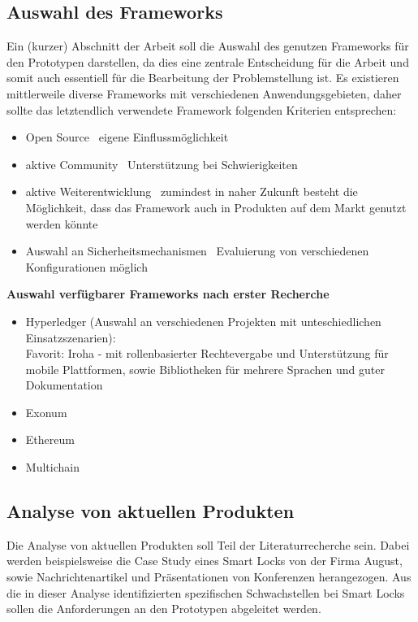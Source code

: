     \subsection*{Auswahl des Frameworks}
        Ein (kurzer) Abschnitt der Arbeit soll die Auswahl des genutzen Frameworks für den Prototypen darstellen, da dies eine zentrale Entscheidung für die Arbeit und somit auch essentiell für die Bearbeitung der Problemstellung ist.
        Es existieren mittlerweile diverse Frameworks mit verschiedenen Anwendungsgebieten, daher sollte das letztendlich verwendete Framework folgenden Kriterien entsprechen:
        \begin{itemize}
            \item Open Source \textrightarrow\ eigene Einflussmöglichkeit
            \item aktive Community \textrightarrow\ Unterstützung bei Schwierigkeiten
            \item aktive Weiterentwicklung \textrightarrow\ zumindest in naher Zukunft besteht die Möglichkeit, dass das Framework auch in Produkten auf dem Markt genutzt werden könnte
            \item Auswahl an Sicherheitsmechanismen \textrightarrow\ Evaluierung von verschiedenen Konfigurationen möglich
        \end{itemize}
        \medskip
        \textbf{Auswahl verfügbarer Frameworks nach erster Recherche}
        \begin{itemize}
            \item Hyperledger (Auswahl an verschiedenen Projekten mit unteschiedlichen Einsatzszenarien):\\
                Favorit: Iroha - mit rollenbasierter Rechtevergabe und Unterstützung für mobile Plattformen, sowie Bibliotheken für mehrere Sprachen und guter Dokumentation
            \item Exonum
            \item Ethereum
            \item Multichain
        \end{itemize}

    \subsection*{Analyse von aktuellen Produkten}
        Die Analyse von aktuellen Produkten soll Teil der Literaturrecherche sein. 
        Dabei werden beispielsweise die Case Study eines Smart Locks von der Firma August\cite{Ye2017}, sowie Nachrichtenartikel\cite{Tsing2017} und Präsentationen von Konferenzen\cite{Rose2014} herangezogen.
        Aus die in dieser Analyse identifizierten spezifischen Schwachstellen bei Smart Locks sollen die Anforderungen an den Prototypen abgeleitet werden.
